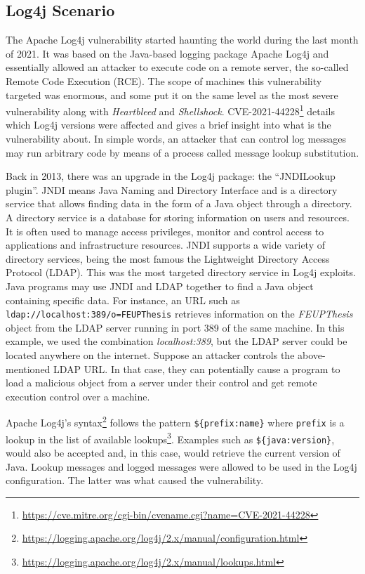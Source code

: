 \subsection{Log4j Scenario} \label{sec:validation_log4j_scenario}

The Apache Log4j vulnerability started haunting the world during the last month of 2021. It was based on the Java-based logging package Apache Log4j and essentially allowed an attacker to execute code on a remote server, the so-called Remote Code Execution (RCE). The scope of machines this vulnerability targeted was enormous, and some put it on the same level as the most severe vulnerability along with \textit{Heartbleed} and \textit{Shellshock}. CVE-2021-44228\footnote{\url{https://cve.mitre.org/cgi-bin/cvename.cgi?name=CVE-2021-44228}} details which Log4j versions were affected and gives a brief insight into what is the vulnerability about. In simple words, an attacker that can control log messages may run arbitrary code by means of a process called message lookup substitution.

Back in 2013, there was an upgrade in the Log4j package: the ``JNDILookup plugin''. JNDI means Java Naming and Directory Interface and is a directory service that allows finding data in the form of a Java object through a directory. A directory service is a database for storing information on users and resources. It is often used to manage access privileges, monitor and control access to applications and infrastructure resources. JNDI supports a wide variety of directory services, being the most famous the Lightweight Directory Access Protocol (LDAP). This was the most targeted directory service in Log4j exploits. Java programs may use JNDI and LDAP together to find a Java object containing specific data. For instance, an URL such as \texttt{ldap://localhost:389/o=FEUPThesis} retrieves information on the \textit{FEUPThesis} object from the LDAP server running in port 389 of the same machine. In this example, we used the combination \textit{localhost:389}, but the LDAP server could be located anywhere on the internet. Suppose an attacker controls the above-mentioned LDAP URL. In that case, they can potentially cause a program to load a malicious object from a server under their control and get remote execution control over a machine.

Apache Log4j's syntax\footnote{\url{https://logging.apache.org/log4j/2.x/manual/configuration.html}} follows the pattern \texttt{\$\{prefix:name\}} where \texttt{prefix} is a lookup in the list of available lookups\footnote{\url{https://logging.apache.org/log4j/2.x/manual/lookups.html}}. Examples such as \texttt{\$\{java:version\}}, would also be accepted and, in this case, would retrieve the current version of Java. Lookup messages and logged messages were allowed to be used in the Log4j configuration. The latter was what caused the vulnerability.


